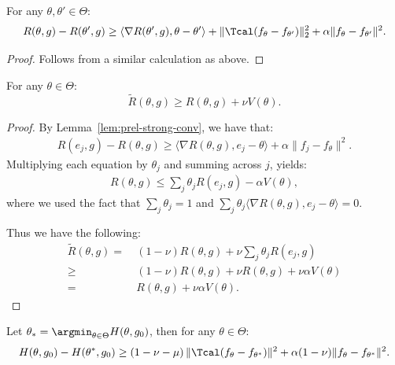 \documentclass[12pt]{extarticle} %
\begin{document}
\begin{lemma}\label{lem:prel-strong-conv} For any $\theta,\theta'\in \Theta$:
\begin{align*}\label{eqn:strong-conv-R-lemma}
    R(\theta, g)-R(\theta', g) \geq \langle \nabla R(\theta', g), \theta - \theta' \rangle + \|\Tcal(f_{\theta} - f_{\theta'})\|_2^2+\alpha\|f_{\theta}-f_{\theta'}\|^2.
\end{align*}
\end{lemma}
\begin{proof}
    Follows from a similar calculation as above.
\end{proof}

\begin{lemma}\label{lem:v-versus-tilde} 
For any $\theta\in \Theta$:
\begin{equation}
    \tilde{R}(\theta, g) \geq R(\theta, g) + \nu V(\theta).
\end{equation}
\end{lemma}
\begin{proof}
By Lemma~\ref{lem:prel-strong-conv}, we have that:
\begin{align*}
    R(e_j, g) - R(\theta, g) \geq \langle \nabla R(\theta, g), e_j - \theta\rangle +\alpha\|f_j - f_\theta\|^2.
\end{align*}
Multiplying each equation by $\theta_j$ and summing across $j$, yields:
\begin{align*}
    R(\theta, g) \leq \sum_j \theta_j R(e_j, g) - \alpha V(\theta),
\end{align*}
where we used the fact that $\sum_{j}\theta_j=1$ and $\sum_{j} \theta_j \langle \nabla R(\theta, g), e_j - \theta\rangle=0$.

Thus we have the following:
\begin{align*}
    \tilde{R}(\theta, g) =~& (1-\nu) R(\theta, g) + \nu \sum_j \theta_j R(e_j, g)\\
    \geq~& (1-\nu) R(\theta, g) + \nu R(\theta, g) +\nu\alpha V(\theta)\\
    =~& R(\theta, g) + \nu\alpha V(\theta).
\end{align*}
\end{proof}
\begin{lemma}\label{lem:strong-conv-tilde}
Let $\theta_*=\argmin_{\theta\in \Theta} H(\theta, g_0)$, then for any $\theta\in \Theta$:
\begin{align}
    H(\theta, g_0) - H(\theta^*, g_0) \geq \left(1-\nu - \mu\right) \|\Tcal(f_{\theta} - f_{\theta^*})\|^2 + \alpha(1-\nu)\|f_{\theta} - f_{\theta^*}\|^2.
\end{align}
\end{lemma}
\end{document}
